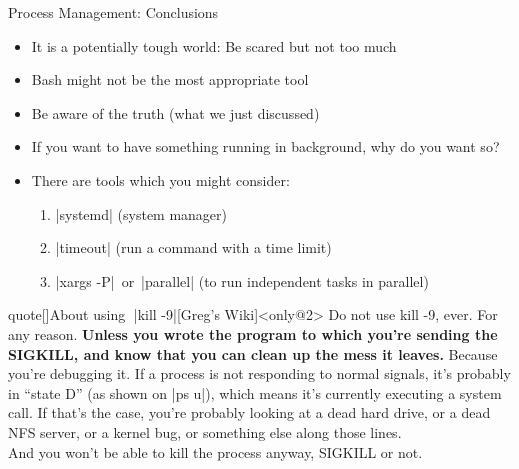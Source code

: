 \begin{frame}{Process Management: Conclusions}
    \vspace{-5mm}
    \begin{overlayarea}{\textwidth}{0.7\textheight}
        \begin{itemize}[<only@1-2>]
            \setlength{\itemsep}{0mm}
            \item It is a potentially tough world: Be scared but not too much
            \item Bash might not be the most appropriate tool
            \item Be aware of the truth (what we just discussed)
            \item If you want to have something running in background, why do you want so?
            \item There are tools which you might consider:\\[0.3ex]
            \begin{enumerate}
                \item \bash|systemd| (system manager)
                \item \bash|timeout| (run a command with a time limit)
                \item \bash|xargs -P| \,or\, \bash|parallel| (to run independent tasks in parallel)
            \end{enumerate}
        \end{itemize}
        \begin{varblock}{quote}[\textwidth]{About using $\;$\bash|kill -9|}[Greg's Wiki]<only@2>
            Do not use kill -9, ever.
            For any reason.
            \textbf{Unless you wrote the program to which you're sending the SIGKILL, and know that you can clean up the mess it leaves.}
            Because you're debugging it.
            If a process is not responding to normal signals, it's probably in ``state D'' (as shown on \textnormal{\bash|ps u|}), which means it's currently executing a system call.
            If that's the case, you're probably looking at a dead hard drive, or a dead NFS server, or a kernel bug, or something else along those lines.\\
            And you won't be able to kill the process anyway, SIGKILL or not.
        \end{varblock}
    \end{overlayarea}
\end{frame}






